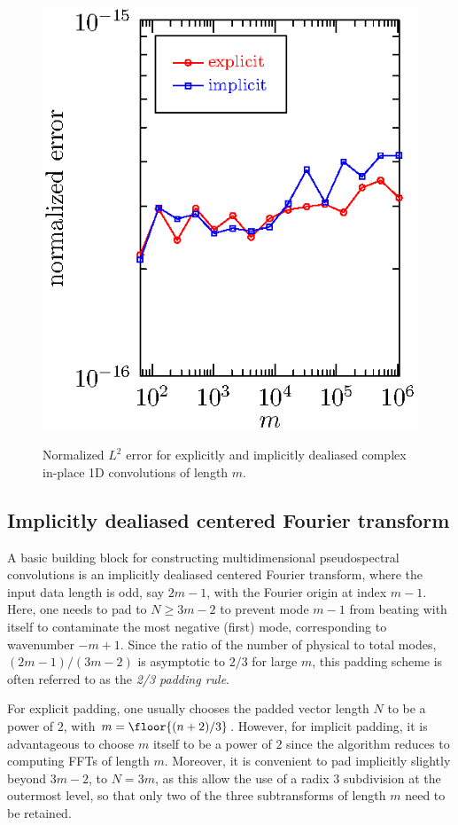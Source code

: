 \documentclass[final]{siamltex}
\begin{document}
\begin{figure}[htbp]
\begin{minipage}{0.49\linewidth}
\begin{center}
\includegraphics{error1c}
\caption{Normalized $L^2$ error for explicitly and implicitly
dealiased complex in-place 1D convolutions of length $m$.}
\label{error1c}
\end{center}
\end{minipage}
\end{figure}

\subsection{Implicitly dealiased centered Fourier transform}\label{fft0}
A basic building block for constructing multidimensional pseudospectral
convolutions is an implicitly dealiased centered Fourier transform, where the
input data length is odd, say $2m-1$, with the Fourier origin at index $m-1$. 
Here, one needs to pad to $N\ge 3m-2$ to prevent 
mode $m-1$ from beating with itself to contaminate the most negative
(first) mode, corresponding to wavenumber $-m+1$. Since the ratio of the
number of physical to total modes, $(2m-1)/(3m-2)$ is asymptotic to $2/3$
for large $m$, this padding scheme is often referred to as the {\it 2/3
padding rule}.

For explicit padding, one usually chooses the padded vector length
$N$ to be a power of $2$, with $m=\floor{(n+2)/3}$.
However, for implicit
padding, it is advantageous to choose $m$ itself to be a power of $2$
since the algorithm reduces to computing FFTs of length $m$.
Moreover, it is convenient to pad implicitly slightly beyond $3m-2$, to $N=3m$,
as this allow the use of a radix $3$ subdivision at the outermost level, so
that only two of the three subtransforms of length $m$ need to be retained. 
\end{document}
